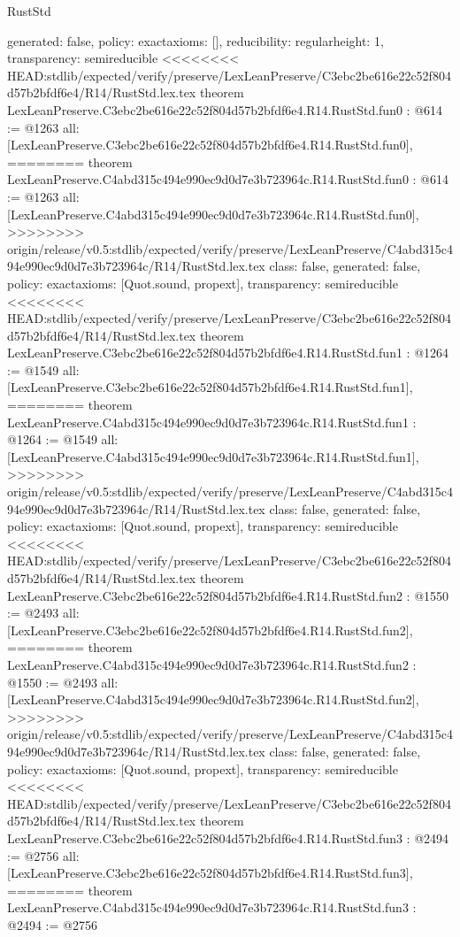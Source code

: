\begin{lexlean}{RustStd}
\begin{coremodule}
{\begin{coremodule}
{{{  generated: false,
  policy: exact{axioms: []},
  reducibility: regular{height: 1},
  transparency: semireducible
}
<<<<<<<< HEAD:stdlib/expected/verify/preserve/LexLeanPreserve/C3ebc2be616e22c52f804d57b2bfdf6e4/R14/RustStd.lex.tex
theorem LexLeanPreserve.C3ebc2be616e22c52f804d57b2bfdf6e4.R14.RustStd.fun0 : @614 := @1263 {
  all: [LexLeanPreserve.C3ebc2be616e22c52f804d57b2bfdf6e4.R14.RustStd.fun0],
========
theorem LexLeanPreserve.C4abd315c494e990ec9d0d7e3b723964c.R14.RustStd.fun0 : @614 := @1263 {
  all: [LexLeanPreserve.C4abd315c494e990ec9d0d7e3b723964c.R14.RustStd.fun0],
>>>>>>>> origin/release/v0.5:stdlib/expected/verify/preserve/LexLeanPreserve/C4abd315c494e990ec9d0d7e3b723964c/R14/RustStd.lex.tex
  class: false,
  generated: false,
  policy: exact{axioms: [Quot.sound, propext]},
  transparency: semireducible
}
<<<<<<<< HEAD:stdlib/expected/verify/preserve/LexLeanPreserve/C3ebc2be616e22c52f804d57b2bfdf6e4/R14/RustStd.lex.tex
theorem LexLeanPreserve.C3ebc2be616e22c52f804d57b2bfdf6e4.R14.RustStd.fun1 : @1264 := @1549 {
  all: [LexLeanPreserve.C3ebc2be616e22c52f804d57b2bfdf6e4.R14.RustStd.fun1],
========
theorem LexLeanPreserve.C4abd315c494e990ec9d0d7e3b723964c.R14.RustStd.fun1 : @1264 := @1549 {
  all: [LexLeanPreserve.C4abd315c494e990ec9d0d7e3b723964c.R14.RustStd.fun1],
>>>>>>>> origin/release/v0.5:stdlib/expected/verify/preserve/LexLeanPreserve/C4abd315c494e990ec9d0d7e3b723964c/R14/RustStd.lex.tex
  class: false,
  generated: false,
  policy: exact{axioms: [Quot.sound, propext]},
  transparency: semireducible
}
<<<<<<<< HEAD:stdlib/expected/verify/preserve/LexLeanPreserve/C3ebc2be616e22c52f804d57b2bfdf6e4/R14/RustStd.lex.tex
theorem LexLeanPreserve.C3ebc2be616e22c52f804d57b2bfdf6e4.R14.RustStd.fun2 : @1550 := @2493 {
  all: [LexLeanPreserve.C3ebc2be616e22c52f804d57b2bfdf6e4.R14.RustStd.fun2],
========
theorem LexLeanPreserve.C4abd315c494e990ec9d0d7e3b723964c.R14.RustStd.fun2 : @1550 := @2493 {
  all: [LexLeanPreserve.C4abd315c494e990ec9d0d7e3b723964c.R14.RustStd.fun2],
>>>>>>>> origin/release/v0.5:stdlib/expected/verify/preserve/LexLeanPreserve/C4abd315c494e990ec9d0d7e3b723964c/R14/RustStd.lex.tex
  class: false,
  generated: false,
  policy: exact{axioms: [Quot.sound, propext]},
  transparency: semireducible
}
<<<<<<<< HEAD:stdlib/expected/verify/preserve/LexLeanPreserve/C3ebc2be616e22c52f804d57b2bfdf6e4/R14/RustStd.lex.tex
theorem LexLeanPreserve.C3ebc2be616e22c52f804d57b2bfdf6e4.R14.RustStd.fun3 : @2494 := @2756 {
  all: [LexLeanPreserve.C3ebc2be616e22c52f804d57b2bfdf6e4.R14.RustStd.fun3],
========
theorem LexLeanPreserve.C4abd315c494e990ec9d0d7e3b723964c.R14.RustStd.fun3 : @2494 := @2756 {
}}}}}}}
\end{coremodule}}
\end{coremodule}
\end{lexlean}
